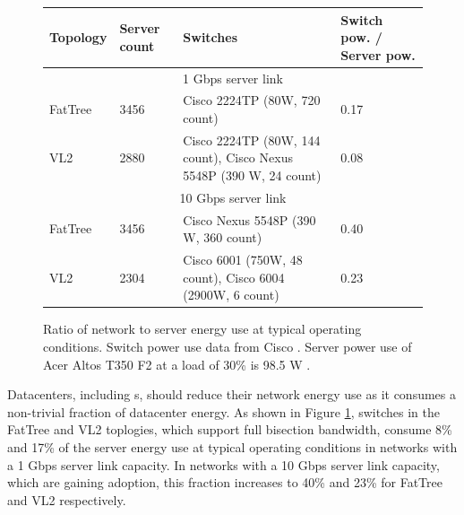 \begin{figure}[t]
\centering
\small
\begin{tabular}{| m{1.5cm} | m{1.5cm} | m{7cm} | m{3cm} |}
\hline
Topology & Server count & Switches & Switch pow. / Server pow. \\ \hline
\multicolumn{4}{|c|}{1 Gbps server link}                                                  \\\hline
FatTree  & 3456        & Cisco 2224TP (80W, 720 count) & 0.17                                      \\\hline
VL2        & 2880        & Cisco  2224TP (80W, 144 count), Cisco Nexus 5548P (390 W, 24 count)                               & 0.08                                      \\ \hline
\multicolumn{4}{|c|}{10 Gbps server link}                                                  \\\hline
FatTree  & 3456        & Cisco Nexus 5548P (390 W, 360 count) & 0.40                                      \\\hline
VL2        & 2304        & Cisco 6001 (750W, 48 count), Cisco 6004 (2900W, 6 count) & 0.23                                      \\ \hline
\end{tabular}

\caption{Ratio of network to server energy use at typical operating conditions. Switch power use data from Cisco \cite{cisco-dc-switches}. Server power use  of Acer Altos T350 F2 at a load of 30\% is 98.5 W \cite{spec}.}
\label{fig:network-power-use}
\end{figure}


Datacenters, including \cdc s, should reduce their network energy use as it consumes a non-trivial fraction of datacenter energy. As shown in Figure \ref{fig:network-power-use},  switches in the FatTree \cite{fattree} and VL2 \cite{vl2} toplogies, which support full bisection bandwidth, consume 8\% and 17\% of the server energy use  at typical operating conditions in networks with a 1 Gbps server link capacity. In networks with a 10 Gbps server link capacity, which are gaining adoption, this fraction increases to 40\% and 23\% for FatTree and VL2 respectively. 


